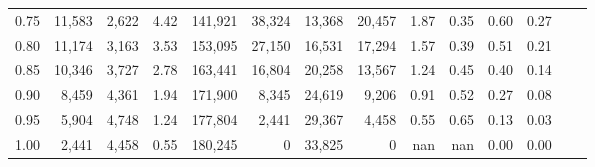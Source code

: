 \begin{tabular}{rrrrrrrrrrrrrr}
0.75 &  11,583 &  2,622 &    4.42 &  141,921 &   38,324 &  13,368 &  20,457 &  1.87 &  0.35 &  0.60 &      0.27 \\
0.80 &  11,174 &  3,163 &    3.53 &  153,095 &   27,150 &  16,531 &  17,294 &  1.57 &  0.39 &  0.51 &      0.21 \\
0.85 &  10,346 &  3,727 &    2.78 &  163,441 &   16,804 &  20,258 &  13,567 &  1.24 &  0.45 &  0.40 &      0.14 \\
0.90 &   8,459 &  4,361 &    1.94 &  171,900 &    8,345 &  24,619 &   9,206 &  0.91 &  0.52 &  0.27 &      0.08 \\
0.95 &   5,904 &  4,748 &    1.24 &  177,804 &    2,441 &  29,367 &   4,458 &  0.55 &  0.65 &  0.13 &      0.03 \\
1.00 &   2,441 &  4,458 &    0.55 &  180,245 &        0 &  33,825 &       0 &   nan &   nan &  0.00 &      0.00 \\
\bottomrule
\end{tabular}
